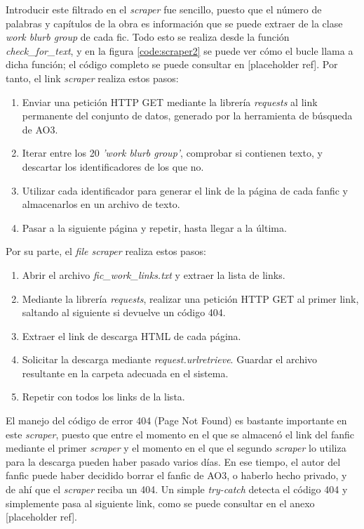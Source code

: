 \documentclass{pre-tfg}
\newcommand{\refToLinkScraperCode}{[placeholder ref]}
\newcommand{\refToFileScraperCode}{[placeholder ref]}
\begin{document}
Introducir este filtrado en el \textit{scraper} fue sencillo, puesto que el número de palabras y capítulos de la obra es información que se puede extraer de la clase \textit{work blurb group} de cada fic. Todo esto se realiza desde la función \textit{check\_for\_text}, y en la figura \ref{code:scraper2} se puede ver cómo el bucle llama a dicha función; el código completo se puede consultar en \refToLinkScraperCode. Por tanto, el link \textit{scraper} realiza estos pasos:
\begin{enumerate}
	\item Enviar una petición HTTP GET mediante la librería \textit{requests} al link permanente del conjunto de datos, generado por la herramienta de búsqueda de AO3.
	\item Iterar entre los 20 \textit{'work blurb group'}, comprobar si contienen texto, y descartar los identificadores de los que no.
	\item Utilizar cada identificador para generar el link de la página de cada fanfic y almacenarlos en un archivo de texto.
	\item Pasar a la siguiente página y repetir, hasta llegar a la última.
\end{enumerate}


Por su parte, el \textit{file scraper} realiza estos pasos:
\begin{enumerate}
	\item Abrir el archivo \textit{fic\_work\_links.txt} y extraer la lista de links.
	\item Mediante la librería \textit{requests}, realizar una petición HTTP GET al primer link, saltando al siguiente si devuelve un código 404.
	\item Extraer el link de descarga HTML de cada página.
	\item Solicitar la descarga mediante \textit{request.urlretrieve}. Guardar el archivo resultante en la carpeta adecuada en el sistema.
	\item Repetir con todos los links de la lista.
\end{enumerate}

El manejo del código de error 404 (Page Not Found) es bastante importante en este \textit{scraper}, puesto que entre el momento en el que se almacenó el link del fanfic mediante el primer \textit{scraper} y el momento en el que el segundo \textit{scraper} lo utiliza para la descarga pueden haber pasado varios días. En ese tiempo, el autor del fanfic puede haber decidido borrar el fanfic de AO3, o haberlo hecho privado, y de ahí que el \textit{scraper} reciba un 404. Un simple \textit{try-catch} detecta el código 404 y simplemente pasa al siguiente link, como se puede consultar en el anexo \refToFileScraperCode.
\end{document}
